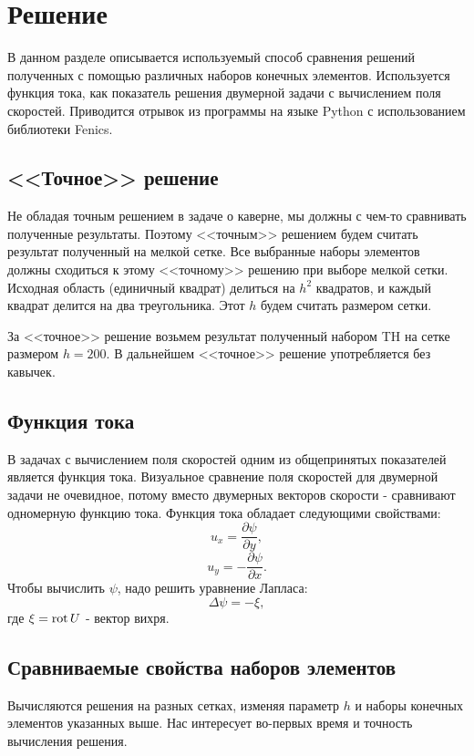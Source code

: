 \documentclass[12pt]{article}
\newcommand{\rot}{\mathop{\rm rot}\nolimits}
\begin{document}
\section{Решение}
В данном разделе описывается используемый способ сравнения решений полученных с помощью различных наборов конечных элементов. Используется функция тока, как показатель решения двумерной задачи с вычислением поля скоростей. Приводится отрывок из программы на языке Python с использованием библиотеки Fenics.

\subsection{<<Точное>> решение}
Не обладая точным решением в задаче о каверне, мы должны с чем-то сравнивать полученные результаты. Поэтому <<точным>> решением будем считать результат полученный на мелкой сетке. Все выбранные наборы элементов должны сходиться к этому <<точному>> решению при выборе мелкой сетки. Исходная область (единичный квадрат) делиться на $h^2$ квадратов, и каждый квадрат делится на два треугольника. Этот $h$ будем считать размером сетки.

За <<точное>> решение возьмем результат полученный набором TH на сетке размером $h=200$. В дальнейшем <<точное>> решение употребляется без кавычек.

\subsection{Функция тока}
В задачах с вычислением поля скоростей одним из общепринятых показателей является функция тока. Визуальное сравнение поля скоростей для двумерной задачи не очевидное, потому вместо двумерных векторов скорости - сравнивают одномерную функцию тока. Функция тока обладает следующими свойствами:
\begin{equation}
u_x = \frac{\partial \psi}{\partial y},
\end{equation}
\begin{equation}
u_y = - \frac{\partial \psi}{\partial x}.
\end{equation}
Чтобы вычислить $\psi$, надо решить уравнение Лапласа:
\begin{equation}
\Delta\psi=-\xi,
\end{equation}
где $\xi=\rot U$ - вектор вихря.

\subsection{Сравниваемые свойства наборов элементов}
Вычисляются решения на разных сетках, изменяя параметр $h$ и наборы конечных элементов указанных выше.
Нас интересует во-первых время и точность вычисления решения.
\end{document}
